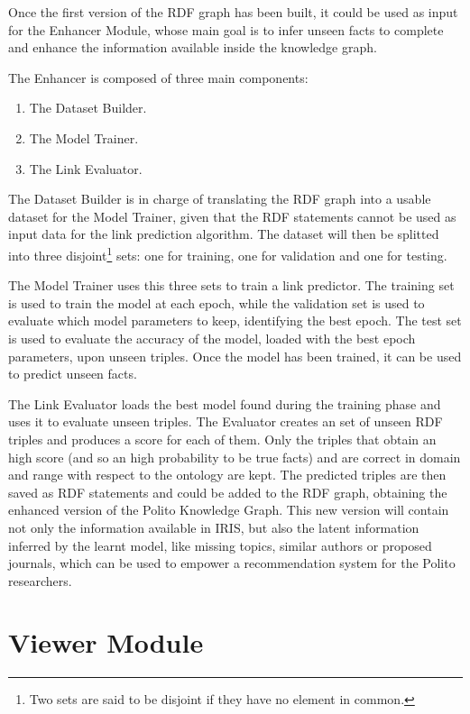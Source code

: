 \documentclass[%
    corpo=13.5pt,
    twoside,
    oldstyle,
    tipotesi=magistrale,
    greek,
    evenboxes
]{toptesi}
\begin{document}
Once the first version of the RDF graph has been built, it could be used as
input for the Enhancer Module, whose main goal is to infer unseen facts to
complete and enhance the information available inside the knowledge graph.

The Enhancer is composed of three main components:

\begin{enumerate}
    \item The Dataset Builder.
    \item The Model Trainer.
    \item The Link Evaluator.
\end{enumerate}

The Dataset Builder is in charge of translating the RDF graph into a usable
dataset for the Model Trainer, given that the RDF statements cannot be used as
input data for the link prediction algorithm.
The dataset will then be splitted into three disjoint\footnote{Two sets are said
to be disjoint if they have no element in common.}
sets: one for training, one for validation and one for testing.

The Model Trainer uses this three sets to train a link predictor. The training
set is used to train the model at each epoch, while the validation set
is used to evaluate which model parameters to keep, identifying the best epoch.
The test set is used to evaluate the accuracy of the model, loaded with the best
epoch parameters, upon unseen triples. Once the model has been trained, it can
be used to predict unseen facts.

The Link Evaluator loads the best model found during the training phase and
uses it to evaluate unseen triples.
The Evaluator creates an set of unseen RDF triples and produces a score for
each of them. Only the triples that obtain an high score (and so an high
probability to be true facts) and are correct in domain and range with respect
to the ontology are kept.
The predicted triples are then saved as RDF statements and could be added
to the RDF graph, obtaining the enhanced version of the Polito Knowledge Graph.
This new version will contain not only the information available in IRIS, but
also the latent information inferred by the learnt model, like missing topics,
similar authors or proposed journals, which can be used to empower a
recommendation system for the Polito researchers.

\section{Viewer Module}
\end{document}
